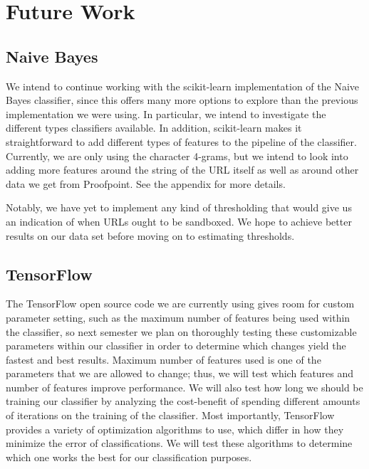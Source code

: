 \documentclass[cs,midyearupdate]{hmcclinic}
\begin{document}

\section{Future Work}

\subsection{Naive Bayes}

We intend to continue working with the scikit-learn implementation of the Naive Bayes classifier, since this offers many more options to explore than the previous implementation we were using. In particular, we intend to investigate the different types classifiers available. In addition, scikit-learn makes it straightforward to add different types of features to the pipeline of the classifier. Currently, we are only using the character 4-grams, but we intend to look into adding more features around the string of the URL itself as well as around other data we get from Proofpoint. See the appendix for more details.

Notably, we have yet to implement any kind of thresholding that would give us an indication of when URLs ought to be sandboxed. We hope to achieve better results on our data set before moving on to estimating thresholds.

\subsection{TensorFlow}

The TensorFlow open source code we are currently using gives room for custom parameter setting, such as the maximum number of features being used within the classifier, so next semester we plan on thoroughly testing these customizable parameters within our classifier in order to determine which changes yield the fastest and best results. Maximum number of features used is one of the parameters that we are allowed to change; thus, we will test which features and number of features improve performance. We will also test how long we should be training our classifier by analyzing the cost-benefit of spending different amounts of iterations on the training of the classifier. Most importantly, TensorFlow provides a variety of optimization algorithms to use, which differ in how they minimize the error of classifications. We will test these algorithms to determine which one works the best for our classification purposes.
\end{document}
